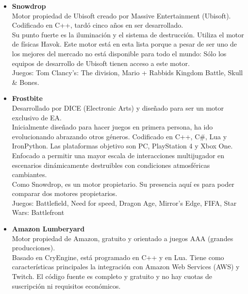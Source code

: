 \begin{itemize}
\item{\textbf{Snowdrop}}\\

\quad Motor propiedad de Ubisoft creado por Massive Entertainment (Ubisoft). Codificado en C++, tardó cinco años en ser desarrollado.\\

\quad Su punto fuerte es la iluminación y el sistema de destrucción. Utiliza el motor de físicas Havok. Este motor está en esta lista porque a pesar de ser uno de los mejores del mercado no está disponible para todo el mundo: Sólo los equipos de desarrollo de Ubisoft tienen acceso a este motor.\\ 

\quad Juegos: Tom Clancy's: The division, Mario + Rabbids Kingdom Battle, Skull \& Bones.\\

\item{\textbf{Frostbite}}\\

\quad Desarrollado por DICE (Electronic Arts) y diseñado para ser un motor exclusivo de EA. \\

\quad Inicialmente diseñado para hacer juegos en primera persona, ha ido evolucionando abrazando otros géneros. Codificado en C++, C\#, Lua y IronPython. Las plataformas objetivo son PC, PlayStation 4 y Xbox One. Enfocado a permitir una mayor escala de interacciones multijugador en escenarios dinámicamente destruibles con condiciones atmosféricas cambiantes. \\ 

\quad Como Snowdrop, es un motor propietario. Su presencia aquí es para poder comparar dos motores propietarios. \\

\quad Juegos: Battlefield, Need for speed, Dragon Age, Mirror's Edge, FIFA, Star Wars: Battlefront\\

\item{\textbf{Amazon Lumberyard}}\\

\quad Motor propiedad de Amazon, gratuito y orientado a juegos AAA (grandes producciones). \\

\quad Basado en CryEngine, está programado en C++ y en Lua. Tiene como características principales la integración con Amazon Web Services (AWS) y Twitch. El código fuente es completo y gratuito y no hay cuotas de suscripción ni requisitos económicos. \\


\end{itemize}
